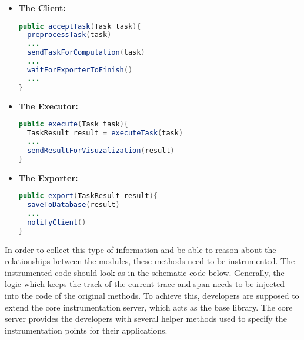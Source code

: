 \begin{itemize}
\item \textbf{The Client:}
\begin{lstlisting}[language=Java]
public acceptTask(Task task){
  preprocessTask(task)
  ...
  sendTaskForComputation(task)
  ...
  waitForExporterToFinish()
  ...
}
\end{lstlisting}

\item \textbf{The Executor:}
\begin{lstlisting}[language=Java]
public execute(Task task){
  TaskResult result = executeTask(task)
  ...
  sendResultForVisuzalization(result)
}
\end{lstlisting}

\item \textbf{The Exporter:}
\begin{lstlisting}[language=Java]
public export(TaskResult result){
  saveToDatabase(result)
  ...
  notifyClient()
}
\end{lstlisting}
\end{itemize}

In order to collect this type of information and be able to reason about the relationships between the modules, these methods need to be instrumented. The instrumented code should look as in the schematic code below. Generally, the logic which keeps the track of the current trace and span needs to be injected into the code of the original methods. To achieve this, developers are supposed to extend the core instrumentation server, which acts as the base library. The core server provides the developers with several helper methods used to specify the instrumentation points for their applications. 

